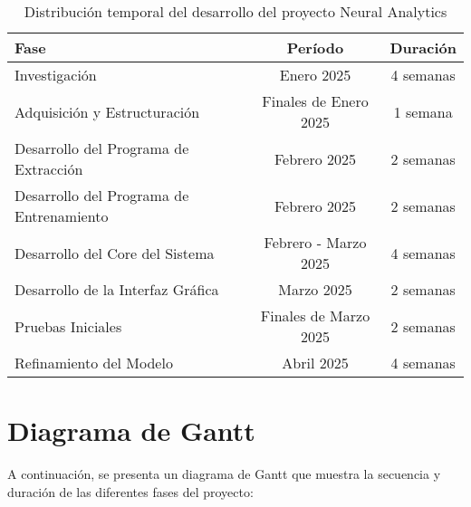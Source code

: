 \begin{table}[ht]
    \centering
    \begin{tabular}{|l|c|c|}
        \hline
        \textbf{Fase} & \textbf{Período} & \textbf{Duración} \\
        \hline
        Investigación & Enero 2025 & 4 semanas \\
        \hline
        Adquisición y Estructuración & Finales de Enero 2025 & 1 semana \\
        \hline
        Desarrollo del Programa de Extracción & Febrero 2025 & 2 semanas \\
        \hline
        Desarrollo del Programa de Entrenamiento & Febrero 2025 & 2 semanas \\
        \hline
        Desarrollo del Core del Sistema & Febrero - Marzo 2025 & 4 semanas \\
        \hline
        Desarrollo de la Interfaz Gráfica & Marzo 2025 & 2 semanas \\
        \hline
        Pruebas Iniciales & Finales de Marzo 2025 & 2 semanas \\
        \hline
        Refinamiento del Modelo & Abril 2025 & 4 semanas \\
        \hline
    \end{tabular}
    \caption{Distribución temporal del desarrollo del proyecto Neural Analytics}
    \label{tab:temporal_distribution}
\end{table}

\newpage
\section{Diagrama de Gantt}

A continuación, se presenta un diagrama de Gantt que muestra la secuencia y duración de las diferentes fases del proyecto:

